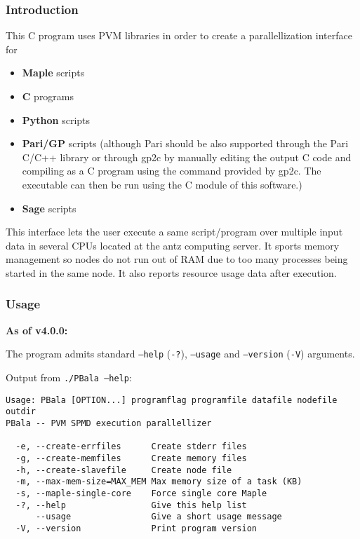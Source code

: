 \begin{appendices}
\subsubsection{Introduction}

This C program uses PVM libraries in order to create a parallellization interface for
\begin{itemize}
 \item \textbf{Maple} scripts
 \item \textbf{C} programs
 \item \textbf{Python} scripts
 \item \textbf{Pari/GP} scripts (although Pari should be also supported through the Pari C/C++ library or through gp2c by manually editing the output C code and compiling as a C program using the command provided by gp2c. The executable can then be run using the C module of this software.)
 \item \textbf{Sage} scripts
\end{itemize}

This interface lets the user execute a same script/program over multiple input data in several CPUs located at the antz computing server. It sports memory management so nodes do not run out of RAM due to too many processes being started in the same node. It also reports resource usage data after execution.

\subsubsection{Usage}

\textbf{As of v4.0.0:}

The program admits standard \texttt{--help} (\texttt{-?}), \texttt{--usage} and \texttt{--version} (\texttt{-V}) arguments.

Output from \texttt{./PBala --help}:
\begin{lstlisting}[style=plainbash]
Usage: PBala [OPTION...] programflag programfile datafile nodefile outdir
PBala -- PVM SPMD execution parallellizer

  -e, --create-errfiles      Create stderr files
  -g, --create-memfiles      Create memory files
  -h, --create-slavefile     Create node file
  -m, --max-mem-size=MAX_MEM Max memory size of a task (KB)
  -s, --maple-single-core    Force single core Maple
  -?, --help                 Give this help list
      --usage                Give a short usage message
  -V, --version              Print program version


\end{lstlisting}
\end{appendices}
